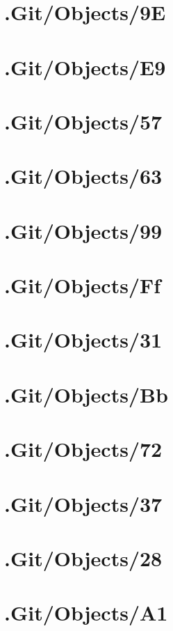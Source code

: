\section*{.Git/Objects/9E}

\section*{.Git/Objects/E9}

\section*{.Git/Objects/57}

\section*{.Git/Objects/63}

\section*{.Git/Objects/99}

\section*{.Git/Objects/Ff}

\section*{.Git/Objects/31}

\section*{.Git/Objects/Bb}

\section*{.Git/Objects/72}

\section*{.Git/Objects/37}

\section*{.Git/Objects/28}

\section*{.Git/Objects/A1}

